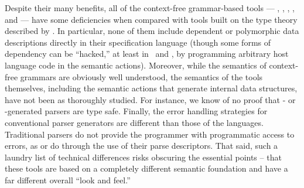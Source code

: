 Despite their many benefits, 
all of the context-free grammar-based tools --- \lex{}, \yacc, 
\antlr, \sablecc, and \demeter{} --- have some deficiencies when compared with
tools built on the type theory described by \ddc. 
In particular, none of them include dependent or 
polymorphic data descriptions directly in their specification language
(though some forms of dependency can be ``hacked,'' at least in
\lex\ and \yacc, by programming arbitrary host language 
code in the semantic actions).  Moreover, while the semantics of
context-free grammars are obviously well understood, the semantics of the
tools themselves, including the semantic actions that generate 
internal data structures, have not been as thoroughly studied.
For instance, we know of no proof that \antlr{}- or 
\sablecc{}-generated parsers are type safe.
Finally, the error handling strategies for conventional
parser generators are different than
those of the \pads{} languages.  Traditional parsers 
do not provide the programmer with
programmatic access to errors, as \padsml{} or \padsc{} do through the
use of their parse
descriptors.  That said, such a laundry list of technical differences risks
obscuring the essential points -- that these tools are based on a 
completely different semantic foundation and have a far different
overall ``look and feel.'' 



